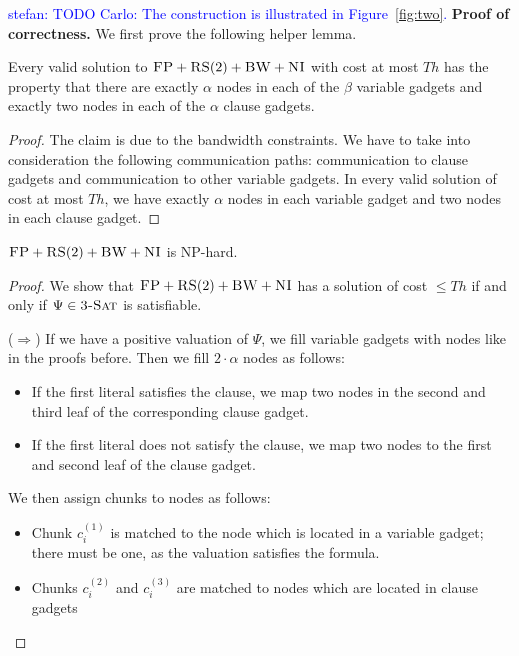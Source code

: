 \documentclass[9pt]{sigcomm-alternate}
\newcommand{\stefan}[1]{\textcolor{blue}{stefan: #1}}
\newcommand{\clauses}{\alpha}
\newcommand{\vars}{\beta}
\newcommand{\achunk}{\ensuremath{c}}
\newcommand{\CC}{\textsc{NI}}
\newcommand{\FP}{\textsc{FP}}
\newcommand{\RS}{\textsc{RS}}
\newcommand{\BW}{\textsc{BW}}
\newcommand{\TSAT}{\textsc{3-Sat}}
\newcommand{\Formula}{\ensuremath{\Psi}}
\newcommand{\Thr}{\ensuremath{Th}}
\begin{document}
\begin{appendix}
\begin{enumerate}
 \end{enumerate}

\stefan{TODO Carlo: The construction is illustrated in Figure~\ref{fig:two}.}
\textbf{Proof of correctness.}
We first prove the following helper lemma.
\begin{lemma}
Every valid solution to $\FP+\RS(2)+\BW+\CC$
with cost at most $\Thr$ has the property that
there are exactly $\clauses$ nodes in each of the $\vars$ variable gadgets
and exactly two nodes in each of the $\clauses$ clause gadgets.
\end{lemma}
\begin{proof}
The claim is due to the bandwidth constraints. We have to take into
consideration the following communication paths:
communication to clause gadgets and
communication to
other variable gadgets.
In every valid solution of cost at most $\Thr$, we have exactly
$\clauses$ nodes in each variable gadget and two nodes in each clause gadget.
\end{proof}

\begin{theorem}
$\FP+\RS(2)+\BW+\CC$ is NP-hard.
\end{theorem}
\begin{proof}
We show that $\FP+\RS(2)+\BW+\CC$ has a solution of cost $\leq
  \Thr$ if and only if $\Formula\in \TSAT$ is satisfiable.

($\Rightarrow$) If we have a positive valuation of $\Formula$, we fill variable gadgets with nodes like in
the proofs before. Then we fill $2 \cdot \clauses$ nodes as follows:
\begin{itemize}
\item If the first literal satisfies the clause, we map two nodes in the second and
third leaf of the corresponding clause gadget.
\item If the first literal does not satisfy the clause, we map two nodes to the first
and second leaf of the clause gadget.
\end{itemize}

We then assign chunks to nodes as follows:
\begin{itemize}
\item Chunk $\achunk_i^{(1)}$ is matched to the node which is located in a variable gadget; there
must be one, as the valuation satisfies the formula.
\item Chunks $\achunk_i^{(2)}$ and $\achunk_i^{(3)}$ are matched to nodes which are
located in clause
gadgets
\end{itemize}


\end{proof}
\end{appendix}
\end{document}

